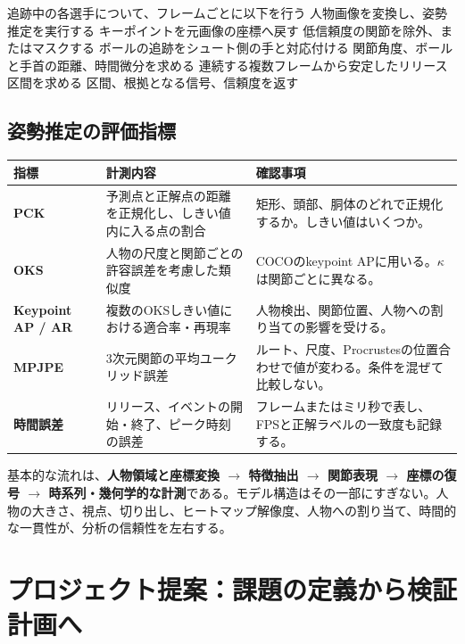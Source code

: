 \documentclass[11pt,a4paper,oneside]{report}
\begin{document}
\begin{pseudoBox}
追跡中の各選手について、フレームごとに以下を行う
  人物画像を変換し、姿勢推定を実行する
  キーポイントを元画像の座標へ戻す
  低信頼度の関節を除外、またはマスクする
  ボールの追跡をシュート側の手と対応付ける
  関節角度、ボールと手首の距離、時間微分を求める
連続する複数フレームから安定したリリース区間を求める
区間、根拠となる信号、信頼度を返す
\end{pseudoBox}

\section{姿勢推定の評価指標}

\begin{tabularx}{\textwidth}{>{\bfseries\RaggedRight}p{3.0cm} Y Y}
\toprule
指標 & 計測内容 & 確認事項 \\
\midrule
PCK & 予測点と正解点の距離を正規化し、しきい値内に入る点の割合 & 矩形、頭部、胴体のどれで正規化するか。しきい値はいくつか。\\
OKS & 人物の尺度と関節ごとの許容誤差を考慮した類似度 & COCOのkeypoint APに用いる。$\kappa$は関節ごとに異なる。\\
Keypoint AP / AR & 複数のOKSしきい値における適合率・再現率 & 人物検出、関節位置、人物への割り当ての影響を受ける。\\
MPJPE & 3次元関節の平均ユークリッド誤差 & ルート、尺度、Procrustesの位置合わせで値が変わる。条件を混ぜて比較しない。\\
時間誤差 & リリース、イベントの開始・終了、ピーク時刻の誤差 & フレームまたはミリ秒で表し、FPSと正解ラベルの一致度も記録する。\\
\bottomrule
\end{tabularx}

\begin{takeawayBox}
基本的な流れは、\textbf{人物領域と座標変換 $\rightarrow$ 特徴抽出 $\rightarrow$ 関節表現 $\rightarrow$ 座標の復号 $\rightarrow$ 時系列・幾何学的な計測}である。モデル構造はその一部にすぎない。人物の大きさ、視点、切り出し、ヒートマップ解像度、人物への割り当て、時間的な一貫性が、分析の信頼性を左右する。
\end{takeawayBox}


\chapter{プロジェクト提案：課題の定義から検証計画へ}
\end{document}
